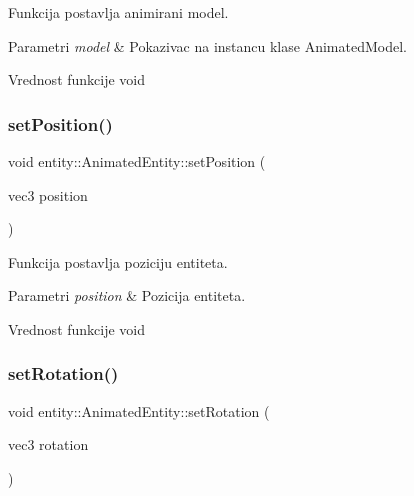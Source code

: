 Funkcija postavlja animirani model. 


\begin{DoxyParams}{Parametri}
{\em model} & Pokazivac na instancu klase Animated\+Model. \\
\hline
\end{DoxyParams}
\begin{DoxyReturn}{Vrednost funkcije}
void 
\end{DoxyReturn}
\mbox{\label{classentity_1_1AnimatedEntity_a757b7e1a09af9299d807e4c5d1b1bab7}} 
\subsubsection{\texorpdfstring{set\+Position()}{setPosition()}}
{\footnotesize\ttfamily void entity\+::\+Animated\+Entity\+::set\+Position (\begin{DoxyParamCaption}\item[{vec3}]{position }\end{DoxyParamCaption})}



Funkcija postavlja poziciju entiteta. 


\begin{DoxyParams}{Parametri}
{\em position} & Pozicija entiteta. \\
\hline
\end{DoxyParams}
\begin{DoxyReturn}{Vrednost funkcije}
void 
\end{DoxyReturn}
\mbox{\label{classentity_1_1AnimatedEntity_a170e9954b61845de9a0a6b016cc8429e}} 
\subsubsection{\texorpdfstring{set\+Rotation()}{setRotation()}}
{\footnotesize\ttfamily void entity\+::\+Animated\+Entity\+::set\+Rotation (\begin{DoxyParamCaption}\item[{vec3}]{rotation }\end{DoxyParamCaption})}



